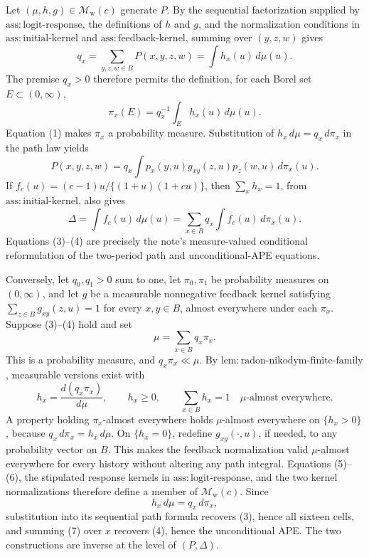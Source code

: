 Let \((\mu,h,g)\in\mathcal M_{\mathrm w}(c)\) generate \(P\).  By the sequential factorization supplied by \(\mathrm{ass{:}logit\text{-}response}\), the definitions of \(h\) and \(g\), and the normalization conditions in \(\mathrm{ass{:}initial\text{-}kernel}\) and \(\mathrm{ass{:}feedback\text{-}kernel}\), summing over \((y,z,w)\) gives
\[
 q_x=\sum_{y,z,w\in B}P(x,y,z,w)=\int h_x(u)\,d\mu(u). \tag{1}
\]
The premise \(q_x>0\) therefore permits the definition, for each Borel set \(E\subset(0,\infty)\),
\[
 \pi_x(E)=q_x^{-1}\int_E h_x(u)\,d\mu(u). \tag{2}
\]
Equation (1) makes \(\pi_x\) a probability measure.  Substitution of \(h_x\,d\mu=q_x\,d\pi_x\) in the path law yields
\[
 P(x,y,z,w)
 =q_x\int p_x(y,u)g_{xy}(z,u)p_z(w,u)\,d\pi_x(u). \tag{3}
\]
If \(f_c(u)=(c-1)u/\{(1+u)(1+cu)\}\), then \(\sum_xh_x=1\), from \(\mathrm{ass{:}initial\text{-}kernel}\), also gives
\[
 \Delta=\int f_c(u)\,d\mu(u)
 =\sum_{x\in B}q_x\int f_c(u)\,d\pi_x(u). \tag{4}
\]
Equations (3)--(4) are precisely the note's measure-valued conditional reformulation of the two-period path and unconditional-APE equations.

Conversely, let \(q_0,q_1>0\) sum to one, let \(\pi_0,\pi_1\) be probability measures on \((0,\infty)\), and let \(g\) be a measurable nonnegative feedback kernel satisfying \(\sum_{z\in B}g_{xy}(z,u)=1\) for every \(x,y\in B\), almost everywhere under each \(\pi_x\).  Suppose (3)--(4) hold and set
\[
 \mu=\sum_{x\in B}q_x\pi_x. \tag{5}
\]
This is a probability measure, and \(q_x\pi_x\ll\mu\).  By \(\mathrm{lem{:}radon\text{-}nikodym\text{-}finite\text{-}family}\), measurable versions exist with
\[
 h_x=\frac{d(q_x\pi_x)}{d\mu},
 \qquad h_x\ge0,
 \qquad \sum_{x\in B}h_x=1
 \quad\mu\text{-almost everywhere}. \tag{6}
\]
A property holding \(\pi_x\)-almost everywhere holds \(\mu\)-almost everywhere on \(\{h_x>0\}\), because \(q_x\,d\pi_x=h_x\,d\mu\).  On \(\{h_x=0\}\), redefine \(g_{xy}(\cdot,u)\), if needed, to any probability vector on \(B\).  This makes the feedback normalization valid \(\mu\)-almost everywhere for every history without altering any path integral.  Equations (5)--(6), the stipulated response kernels in \(\mathrm{ass{:}logit\text{-}response}\), and the two kernel normalizations therefore define a member of \(\mathcal M_{\mathrm w}(c)\).  Since
\[
 h_x\,d\mu=q_x\,d\pi_x, \tag{7}
\]
substitution into its sequential path formula recovers (3), hence all sixteen cells, and summing (7) over \(x\) recovers (4), hence the unconditional APE.  The two constructions are inverse at the level of \((P,\Delta)\).

